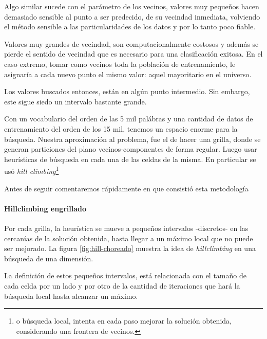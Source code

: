 Algo similar sucede con el parámetro de los vecinos, valores muy
pequeños hacen demasiado sensible al punto a ser predecido, de su
vecindad inmediata, volviendo el método sensible a las
particularidades de los datos y por lo tanto poco fiable.

Valores muy grandes de vecindad, son computacionalmente costosos y
además se pierde el sentido de vecindad que es necesario para una
clasificación exitosa. En el caso extremo, tomar como vecinos toda la
población de entrenamiento, le asignaría a cada nuevo punto el mismo
valor: aquel mayoritario en el universo.

Los valores buscados entonces, están en algún punto intermedio. Sin
embargo, este sigue siedo un intervalo bastante grande.

Con un vocabulario del orden de las 5 mil palábras y una cantidad de
datos de entrenamiento del orden de los 15 mil, tenemos un espacio
enorme para la búsqueda. Nuestra aproximación al problema, fue el de
hacer una grilla, donde se generan particiones del plano
vecinos-componentes de forma regular. Luego usar heurísticas de
búsqueda en cada una de las celdas de la misma. En particular se usó
\emph{hill climbing}\cite{aiama}\footnote{o búsqueda local, intenta en
  cada paso mejorar la solución obtenida, considerando una frontera de
  vecinos.}

Antes de seguir comentaremos rápidamente en que consistió esta metodología

\paragraph{Hillclimbing engrillado}

Por cada grilla, la heurística se mueve a pequeños intervalos
-discretos- en las cercanías de la solución obtenida, hasta llegar a
un máximo local que no puede ser mejorado.  La figura
\ref{fig:hill-choreado} muestra la idea de \emph{hillclimbing} en una
búsqueda de una dimensión.
 
La definición de estos pequeños intervalos, está relacionada con el
tamaño de cada celda por un lado y por otro de la cantidad de
iteraciones que hará la búsqueda local hasta alcanzar un máximo. 

